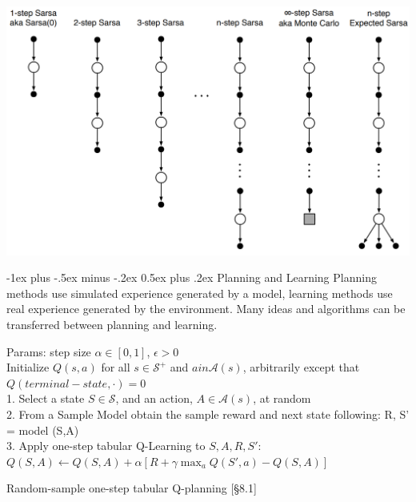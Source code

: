 \documentclass[10pt,landscape]{article}
\makeatletter
\renewcommand{\section}{\@startsection{section}{1}{0mm}%
                                {-1ex plus -.5ex minus -.2ex}%
                                {0.5ex plus .2ex}%
                                {\normalfont\large\bfseries}}
\makeatother
\begin{document}
\begin{multicols}{3}
\begin{center}
    \includegraphics[width=0.9\linewidth]{images/nstep_sarsa_backup.png}
\end{center}


\section{Planning and Learning}
Planning methods use simulated experience generated by a model, learning methods use real experience generated by the environment. 
Many ideas and algorithms can be transferred between planning and learning.

\begin{algorithm}[H]
 Params: step size $\alpha \in [0,1]$, $\epsilon > 0$\\
 Initialize $Q(s,a)$ for all $s \in \mathcal{S}^+$ and $a in \mathcal{A}(s)$, arbitrarily except that $Q(terminal-state, \cdot) = 0$\\
{
	1. Select a state $S \in \mathcal{S}$, and an action, $A \in \mathcal{A}(s)$, at random\\
	2. From a Sample Model obtain the sample reward and next state following: R, S' = model (S,A)\\
	3. Apply one-step tabular Q-Learning to $S, A, R, S'$:\\
	$Q(S, A) \leftarrow Q(S, A) + \alpha \left[R + \gamma \max_a Q(S', a) - Q(S, A)  \right]$\\
 }
\caption{Random-sample one-step tabular Q-planning [§8.1]}
\end{algorithm}


\end{multicols}
\end{document}
